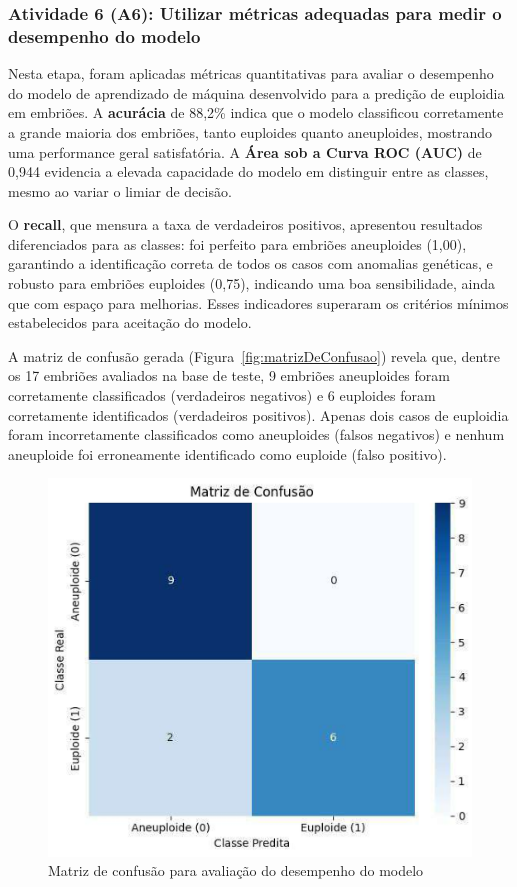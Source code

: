 \subsubsection{Atividade 6 (A6): Utilizar métricas adequadas para medir o desempenho do modelo}
Nesta etapa, foram aplicadas métricas quantitativas para avaliar o desempenho do modelo de aprendizado de máquina desenvolvido para a predição de euploidia em embriões. A \textbf{acurácia} de 88,2\% indica que o modelo classificou corretamente a grande maioria dos embriões, tanto euploides quanto aneuploides, mostrando uma performance geral satisfatória. A \textbf{Área sob a Curva ROC (AUC)} de 0,944 evidencia a elevada capacidade do modelo em distinguir entre as classes, mesmo ao variar o limiar de decisão. 

O \textbf{recall}, que mensura a taxa de verdadeiros positivos, apresentou resultados diferenciados para as classes: foi perfeito para embriões aneuploides (1,00), garantindo a identificação correta de todos os casos com anomalias genéticas, e robusto para embriões euploides (0,75), indicando uma boa sensibilidade, ainda que com espaço para melhorias. Esses indicadores superaram os critérios mínimos estabelecidos para aceitação do modelo.

A matriz de confusão gerada (Figura~\ref{fig:matrizDeConfusao}) revela que, dentre os 17 embriões avaliados na base de teste, 9 embriões aneuploides foram corretamente classificados (verdadeiros negativos) e 6 euploides foram corretamente identificados (verdadeiros positivos). Apenas dois casos de euploidia foram incorretamente classificados como aneuploides (falsos negativos) e nenhum aneuploide foi erroneamente identificado como euploide (falso positivo).

\begin{figure}[h]
    \captionsetup{font=footnotesize, justification=centering, labelsep=period, position=above}
    \caption{Matriz de confusão para avaliação do desempenho do modelo}
    \label{fig:cmatrizDeConfusao}
    \centering
    \includegraphics[scale=0.11]{figuras/IA/matrizDeConfusao.pdf}
\end{figure}
\FloatBarrier


